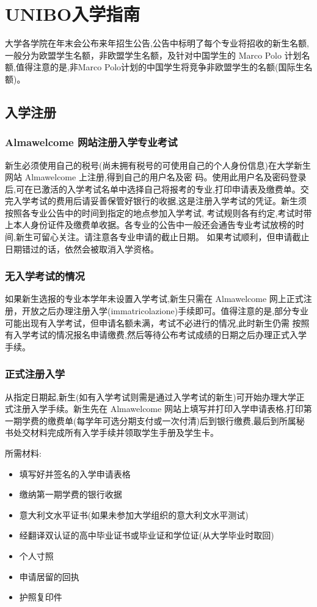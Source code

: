 \documentclass[3pt,a5paper,openright,twoside]{book}
\begin{document}
\chapter{UNIBO入学指南}              

大学各学院在年末会公布来年招生公告,公告中标明了每个专业将招收的新生名额,一般分为欧盟学生名额，非欧盟学生名额，及针对中国学生的 Marco Polo 计划名额,值得注意的是,非Marco Polo计划的中国学生将竞争非欧盟学生的名额(国际生名额)。 

\section{入学注册}

\subsection{Almawelcome 网站注册入学专业考试}
新生必须使用自己的税号(尚未拥有税号的可使用自己的个人身份信息)在大学新生网站 Almawelcome 上注册,得到自己的用户名及密 码。使用此用户名及密码登录后,可在已激活的入学考试名单中选择自己将报考的专业,打印申请表及缴费单。交完入学考试的费用后请妥善保管好银行的收据,这是注册入学考试的凭证。新生须按照各专业公告中的时间到指定的地点参加入学考试, 考试规则各有约定,考试时带上本人身份证件及缴费单收据。各专业的公告中一般还会通告专业考试放榜的时间,新生可留心关注。请注意各专业申请的截止日期。 如果考试顺利，但申请截止日期错过的话，依然会被取消入学资格。

\subsection{无入学考试的情况}
如果新生选报的专业本学年未设置入学考试,新生只需在 Almawelcome 网上正式注册，开放之后办理注册入学(immatricolazione)手续即可。值得注意的是,部分专业可能出现有入学考试，但申请名额未满，考试不必进行的情况,此时新生仍需 按照有入学考试的情况报名申请缴费,然后等待公布考试成绩的日期之后办理正式入学手续。 
\subsection{正式注册入学}
从指定日期起,新生(如有入学考试则需是通过入学考试的新生)可开始办理大学正式注册入学手续。新生先在 Almawelcome 网站上填写并打印入学申请表格,打印第一期学费的缴费单(每学年可选分期支付或一次付清)后到银行缴费,最后到所属秘书处交材料完成所有入学手续并领取学生手册及学生卡。 

所需材料:
\begin{itemize}
\item 填写好并签名的入学申请表格 
\item 缴纳第一期学费的银行收据 
\item 意大利文水平证书(如果未参加大学组织的意大利文水平测试) 
\item 经翻译双认证的高中毕业证书或毕业证和学位证(从大学毕业时取回)
\item 个人寸照
\item 申请居留的回执
\item 护照复印件 
\end{itemize}
\end{document}
